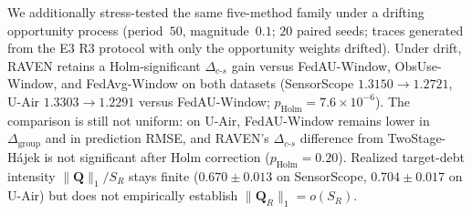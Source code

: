 \documentclass[letterpaper,journal]{IEEEtran}
\begin{document}
We additionally stress-tested the same five-method family under a drifting
opportunity process (period~$50$, magnitude~$0.1$; $20$ paired seeds;
traces generated from the E3 R3 protocol with only the opportunity weights
drifted).  Under drift, RAVEN retains a Holm-significant $\Delta_{c\text{-}s}$
gain versus FedAU-Window, ObsUse-Window, and FedAvg-Window on both datasets
(SensorScope $1.3150\rightarrow 1.2721$, U-Air $1.3303\rightarrow 1.2291$
versus FedAU-Window; $p_{\mathrm{Holm}}=7.6\times 10^{-6}$).  The comparison
is still not uniform: on U-Air, FedAU-Window remains lower in
$\Delta_{\mathrm{group}}$ and in prediction RMSE, and RAVEN's
$\Delta_{c\text{-}s}$ difference from TwoStage-H\'ajek is not significant
after Holm correction ($p_{\mathrm{Holm}}=0.20$).  Realized target-debt
intensity $\|\mathbf Q\|_1/S_R$ stays finite
($0.670\pm 0.013$ on SensorScope, $0.704\pm 0.017$ on U-Air) but does not
empirically establish $\|\mathbf Q_R\|_1=o(S_R)$.
\end{document}
